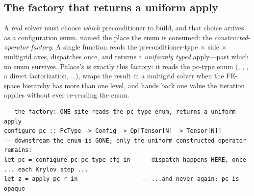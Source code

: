 \subsection{The factory that returns a uniform apply}

A real solver must choose \emph{which} preconditioner to build, and that choice arrives as
a configuration enum.  named the place the enum is consumed: the
\emph{constructed-operator factory}. A single function reads the
preconditioner-type$\,\times\,$side$\,\times\,$multigrid axes, dispatches once, and returns
a \emph{uniformly typed} apply---past which no enum survives. Palace's
 is exactly this factory: it reads the pc-type enum
(, , , a direct factorization, \dots), wraps the
result in a multigrid solver when the FE-space hierarchy has more than one level, and hands
back one  value the iteration applies without ever re-reading the enum.

\begin{lstlisting}[style=l4style]
-- the factory: ONE site reads the pc-type enum, returns a uniform apply
configure_pc :: PcType -> Config -> Op[Tensor[N] -> Tensor[N]]
-- downstream the enum is GONE; only the uniform constructed operator remains:
let pc = configure_pc pc_type cfg in   -- dispatch happens HERE, once
... each Krylov step ...
let z = apply pc r in                  -- ...and never again; pc is opaque
\end{lstlisting}

